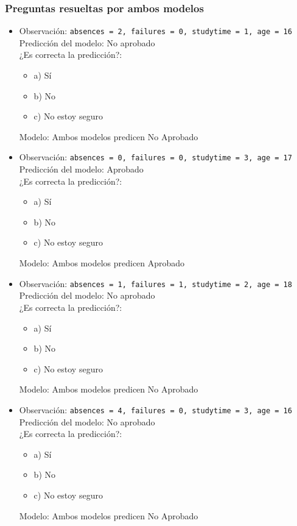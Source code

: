 \subsubsection{Preguntas resueltas por ambos modelos}
\begin{itemize}
    \item Observación: \texttt{absences = 2, failures = 0, studytime = 1, age = 16}\\
    Predicción del modelo: No aprobado\\
    ¿Es correcta la predicción?:
    \begin{itemize}
        \item a) Sí
        \item b) No
        \item c) No estoy seguro
    \end{itemize}
    Modelo: Ambos modelos predicen No Aprobado

    \item Observación: \texttt{absences = 0, failures = 0, studytime = 3, age = 17}\\
    Predicción del modelo: Aprobado\\
    ¿Es correcta la predicción?:
    \begin{itemize}
        \item a) Sí
        \item b) No
        \item c) No estoy seguro
    \end{itemize}
    Modelo: Ambos modelos predicen Aprobado

    \item Observación: \texttt{absences = 1, failures = 1, studytime = 2, age = 18}\\
    Predicción del modelo: No aprobado\\
    ¿Es correcta la predicción?:
    \begin{itemize}
        \item a) Sí
        \item b) No
        \item c) No estoy seguro
    \end{itemize}
    Modelo: Ambos modelos predicen No Aprobado

    \item Observación: \texttt{absences = 4, failures = 0, studytime = 3, age = 16}\\
    Predicción del modelo: No aprobado\\
    ¿Es correcta la predicción?:
    \begin{itemize}
        \item a) Sí
        \item b) No
        \item c) No estoy seguro
    \end{itemize}
    Modelo: Ambos modelos predicen No Aprobado
\end{itemize}

